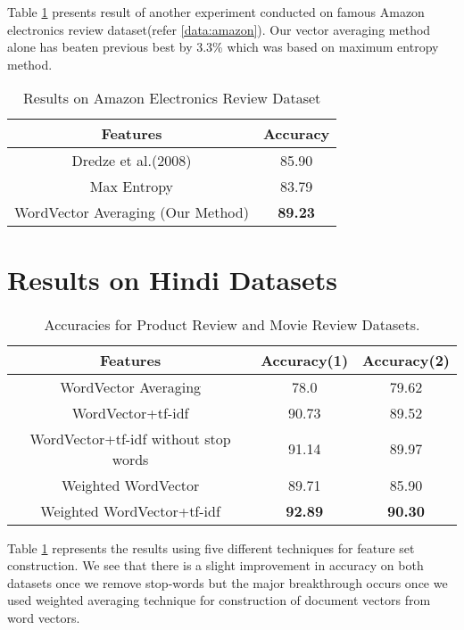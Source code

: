 Table \ref{table:amazon} presents result of another experiment conducted on famous Amazon electronics review dataset(refer \ref{data:amazon}). Our vector averaging method alone has beaten previous best by 3.3\% which was based on maximum entropy method.
\begin {table}[H]
\centering
\begin{tabular}{ | c | c | }
\hline
\textbf{Features} & \textbf{Accuracy} \\ \hline
Dredze et al.(2008) & 85.90\\ \hline
Max Entropy & 83.79\\ \hline
WordVector Averaging (Our Method) & \textbf{89.23}\\ \hline
\end{tabular}
\caption {Results on Amazon Electronics Review Dataset}
\label{table:amazon}
\end{table}


\section{Results on Hindi Datasets}
\label{table:hindi_ourmethods}
\begin {table}[h!]
\centering
\begin{tabular}{ | c | c | c | }
\hline
\textbf{Features} & \textbf{Accuracy(1)} & \textbf{Accuracy(2)} \\ \hline
WordVector Averaging & 78.0 & 79.62\\ \hline
WordVector+tf-idf & 90.73 & 89.52\\ \hline
WordVector+tf-idf without stop words & 91.14 & 89.97\\ \hline
Weighted WordVector & 89.71 & 85.90\\ \hline
Weighted WordVector+tf-idf & \textbf{92.89} & \textbf{90.30}\\ \hline
\end{tabular}
\caption {Accuracies for Product Review and Movie Review Datasets.}
\end{table}

Table \ref{table:hindi_ourmethods} represents the results using five different techniques for feature set construction. We see that there is a slight improvement in accuracy on both datasets once we remove stop-words but the major breakthrough occurs once we used weighted averaging technique for construction of document vectors from word vectors.


